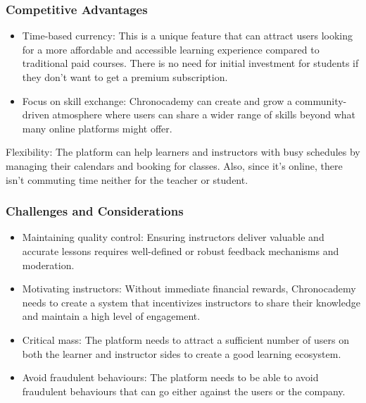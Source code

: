 \subsubsection{Competitive Advantages}
\begin{itemize}
    \item Time-based currency: This is a unique feature that can attract users looking for a more affordable and accessible learning experience compared to traditional paid courses.
    There is no need for initial investment for students if they don’t want to get a premium subscription.
    \item Focus on skill exchange: Chronocademy can create and grow a community-driven atmosphere where users can share a wider range of skills beyond what many online platforms might offer.
\end{itemize}
Flexibility: The platform can help learners and instructors with busy schedules by managing their calendars and booking for classes.
Also, since it’s online, there isn’t commuting time neither for the teacher or student.

\subsubsection{Challenges and Considerations}
\begin{itemize}
    \item Maintaining quality control: Ensuring instructors deliver valuable and accurate lessons requires well-defined or robust feedback mechanisms and moderation.
    \item Motivating instructors: Without immediate financial rewards, Chronocademy needs to create a system that incentivizes instructors to share their knowledge and maintain a high level of engagement.
    \item Critical mass: The platform needs to attract a sufficient number of users on both the learner and instructor sides to create a good learning ecosystem.
    \item Avoid fraudulent behaviours: The platform needs to be able to avoid fraudulent behaviours that can go either against the users or the company.
\end{itemize}

